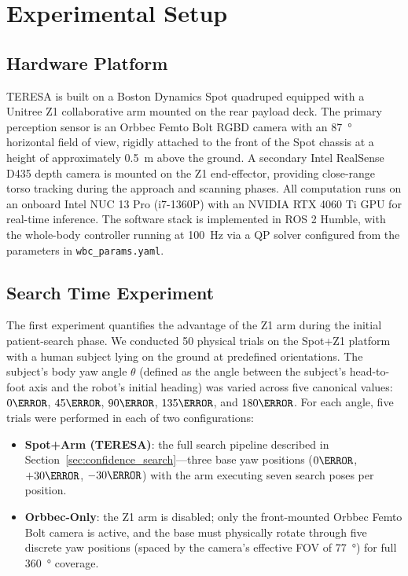 \section{Experimental Setup}
\label{sec:experiments}

\subsection{Hardware Platform}

\ac{TERESA} is built on a Boston Dynamics Spot quadruped equipped with a
Unitree Z1 collaborative arm mounted on the rear payload deck. The primary
perception sensor is an Orbbec Femto Bolt \ac{RGBD} camera with an
\SI{87}{\degree} horizontal field of view, rigidly attached to the front of
the Spot chassis at a height of approximately \SI{0.5}{\metre} above the
ground. A secondary Intel RealSense D435 depth camera is mounted on the Z1
end-effector, providing close-range torso tracking during the approach and
scanning phases. All computation runs on an onboard Intel NUC 13 Pro
(i7-1360P) with an NVIDIA RTX 4060 Ti GPU for real-time inference. The
software stack is implemented in ROS 2 Humble, with the whole-body controller
running at \SI{100}{\hertz} via a \ac{QP} solver configured from the
parameters in \texttt{wbc\_params.yaml}.

\subsection{Search Time Experiment}

The first experiment quantifies the advantage of the Z1 arm during the
initial patient-search phase. We conducted 50 physical trials on the Spot+Z1
platform with a human subject lying on the ground at predefined orientations.
The subject's body yaw angle $\theta$ (defined as the angle between the
subject's head-to-foot axis and the robot's initial heading) was varied across
five canonical values: $0\degree$, $45\degree$, $90\degree$, $135\degree$, and
$180\degree$.  For each angle, five trials were performed in each of two
configurations:

\begin{itemize}
  \item \textbf{Spot+Arm (TERESA)}: the full search pipeline described in
        Section~\ref{sec:confidence_search}---three base yaw positions
        ($0\degree$, $+30\degree$, $-30\degree$) with the arm executing
        seven search poses per position.
  \item \textbf{Orbbec-Only}: the Z1 arm is disabled; only the
        front-mounted Orbbec Femto Bolt camera is active, and the base
        must physically rotate through five discrete yaw positions
        (spaced by the camera's effective FOV of \SI{77}{\degree}) for
        full \SI{360}{\degree} coverage.
\end{itemize}

